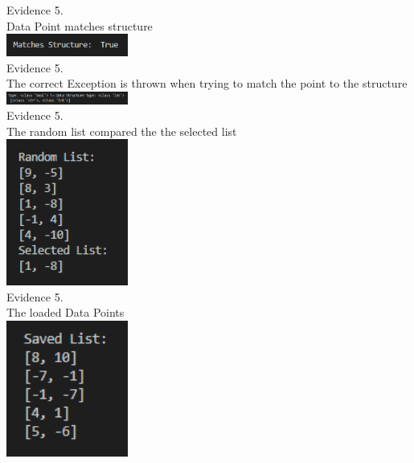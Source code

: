 \begin{flushleft}
\begin{center}
        {\large Evidence 5.\rn } \\ 
        \vspace{0.3cm}
        Data Point matches structure \\
        \includegraphics[width=4cm]{Images/Testing/T4.5.1.PNG} \\

        {\large Evidence 5.\rn } \\ 
        \vspace{0.3cm}
        The correct Exception is thrown when trying to match the point to the structure \\
        \includegraphics[width=4cm]{Images/Testing/T4.6.1.PNG} \\

        {\large Evidence 5.\rn } \\ 
        \vspace{0.3cm}
        The random list compared the the selected list \\
        \includegraphics[width=4cm]{Images/Testing/T4.7.1.PNG} \\

        {\large Evidence 5.\rn } \\ 
        \vspace{0.3cm}
        The loaded Data Points \\
        \includegraphics[width=4cm]{Images/Testing/T4.8.1.PNG} \\


\end{center}
\end{flushleft}
